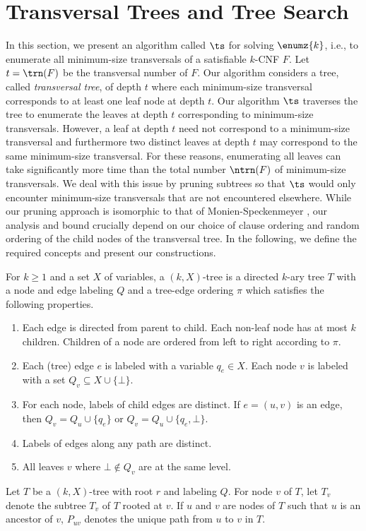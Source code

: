 \section{Transversal Trees  and Tree Search} \label{sec:transversal-tree}

In this section, we present an algorithm called $\ts$ 
for solving $\enumz{k}$, i.e., 
to enumerate all minimum-size transversals 
of a satisfiable $k$-CNF $F$. Let  $t=\trn(F)$ be the transversal number of $F$.
Our algorithm considers a tree,
called \emph{transversal tree}, of depth $t$
where each minimum-size transversal corresponds to at least
one leaf node at depth $t$.
Our algorithm $\ts$ traverses the tree to enumerate 
the leaves at depth $t$ corresponding to 
minimum-size transversals. 
However, 
a leaf at depth $t$ 
need not correspond to a minimum-size transversal and 
furthermore two distinct leaves at depth $t$ may 
correspond to the same
minimum-size transversal.
For these reasons, 
enumerating all leaves can take significantly more
time than the total number $\ntrn(F)$
of minimum-size transversals.
We
deal with this issue by pruning subtrees so that 
$\ts$ would only encounter 
minimum-size transversals 
that are not encountered elsewhere.
While our pruning approach is isomorphic to that of Monien-Speckenmeyer \cite{MonienS85}, 
our analysis and bound crucially depend on 
our choice of clause ordering 
and random ordering of the child nodes of the transversal tree.
In the following, we define the required concepts and present 
our constructions.

\begin{definition}[$(k,X)$-trees]
For $k\geq 1$ and  a set $X$ of variables, a $(k,X)$-tree
is a directed $k$-ary tree $T$ 
with a node and edge labeling $Q$ and a tree-edge ordering $\pi$
which satisfies the following properties.
\begin{enumerate}
\item Each edge  is directed from parent to child.
Each non-leaf node has at most $k$ children. Children of a node
are ordered from left to right according to $\pi$.
\item 
Each (tree) edge $e$ is labeled with a variable $q_e\in X$.
Each node $v$ is labeled with a set $Q_v \subseteq X\cup\{\bot\}$.

\item 
For each node, labels of child edges are distinct.
If $e= (u,v)$ is an edge, then 
$Q_v = Q_u\cup \{q_e\}$ or
$Q_v = Q_u\cup \{q_e, \bot\}$.
\item
Labels of  edges along any path are distinct.
\item All leaves $v$ where $\bot\notin Q_v$ 
are at the same level.
\end{enumerate}
\end{definition}
Let $T$ be a $(k,X)$-tree with root $r$ and labeling $Q$.
For node $v$ of $T$, 
let $T_v$ denote the subtree $T_v$ of $T$ rooted at $v$.
If $u$ and $v$ are nodes of $T$ 
such that $u$ is an ancestor of $v$, $P_{uv}$ denotes the unique 
path from $u$ to $v$ in $T$.

